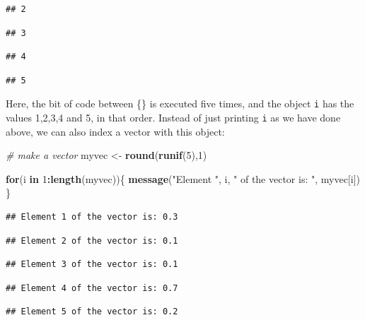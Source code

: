 \documentclass[]{book}
\newenvironment{Shaded}{\begin{snugshade}}{\end{snugshade}}
\newcommand{\CommentTok}[1]{\textcolor[rgb]{0.56,0.35,0.01}{\textit{#1}}}
\newcommand{\ControlFlowTok}[1]{\textcolor[rgb]{0.13,0.29,0.53}{\textbf{#1}}}
\newcommand{\DecValTok}[1]{\textcolor[rgb]{0.00,0.00,0.81}{#1}}
\newcommand{\KeywordTok}[1]{\textcolor[rgb]{0.13,0.29,0.53}{\textbf{#1}}}
\newcommand{\NormalTok}[1]{#1}
\newcommand{\OperatorTok}[1]{\textcolor[rgb]{0.81,0.36,0.00}{\textbf{#1}}}
\newcommand{\StringTok}[1]{\textcolor[rgb]{0.31,0.60,0.02}{#1}}
\begin{document}
\begin{verbatim}
## 2
\end{verbatim}

\begin{verbatim}
## 3
\end{verbatim}

\begin{verbatim}
## 4
\end{verbatim}

\begin{verbatim}
## 5
\end{verbatim}

Here, the bit of code between \{\} is executed five times, and the object \texttt{i} has the values 1,2,3,4 and 5, in that order. Instead of just printing \texttt{i} as we have done above, we can also index a vector with this object:

\begin{Shaded}
\begin{Highlighting}[]
\CommentTok{# make a vector}
\NormalTok{myvec <-}\StringTok{ }\KeywordTok{round}\NormalTok{(}\KeywordTok{runif}\NormalTok{(}\DecValTok{5}\NormalTok{),}\DecValTok{1}\NormalTok{)}

\ControlFlowTok{for}\NormalTok{(i }\ControlFlowTok{in} \DecValTok{1}\OperatorTok{:}\KeywordTok{length}\NormalTok{(myvec))\{}
  \KeywordTok{message}\NormalTok{(}\StringTok{"Element "}\NormalTok{, i, }\StringTok{" of the vector is: "}\NormalTok{, myvec[i])}
\NormalTok{\}}
\end{Highlighting}
\end{Shaded}

\begin{verbatim}
## Element 1 of the vector is: 0.3
\end{verbatim}

\begin{verbatim}
## Element 2 of the vector is: 0.1
\end{verbatim}

\begin{verbatim}
## Element 3 of the vector is: 0.1
\end{verbatim}

\begin{verbatim}
## Element 4 of the vector is: 0.7
\end{verbatim}

\begin{verbatim}
## Element 5 of the vector is: 0.2
\end{verbatim}
\end{document}
